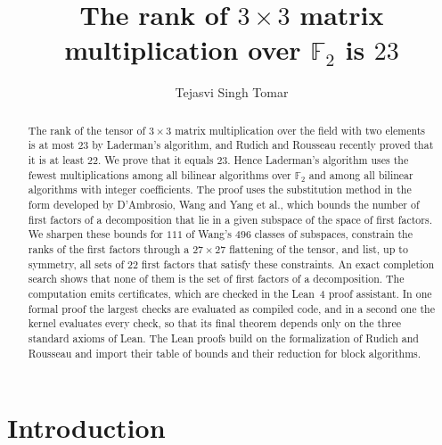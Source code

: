 \documentclass[11pt]{amsart}
\theoremstyle{definition}
\theoremstyle{remark}
\numberwithin{equation}{section}
\newcommand{\F}{\mathbb{F}_2}
\begin{document}
\title{The rank of $3\times 3$ matrix multiplication over $\F$ is $23$}
\author{Tejasvi Singh Tomar}
\address{Independent researcher}
\renewcommand{\urladdrname}{{\itshape ORCID}}

\begin{abstract}
The rank of the tensor of $3\times 3$ matrix multiplication over the field with two elements is at most $23$ by Laderman's algorithm, and Rudich and Rousseau recently proved that it is at least $22$. We prove that it equals $23$. Hence Laderman's algorithm uses the fewest multiplications among all bilinear algorithms over $\F$ and among all bilinear algorithms with integer coefficients. The proof uses the substitution method in the form developed by D'Ambrosio, Wang and Yang et al., which bounds the number of first factors of a decomposition that lie in a given subspace of the space of first factors. We sharpen these bounds for $111$ of Wang's $496$ classes of subspaces, constrain the ranks of the first factors through a $27\times 27$ flattening of the tensor, and list, up to symmetry, all sets of $22$ first factors that satisfy these constraints. An exact completion search shows that none of them is the set of first factors of a decomposition. The computation emits certificates, which are checked in the Lean~4 proof assistant. In one formal proof the largest checks are evaluated as compiled code, and in a second one the kernel evaluates every check, so that its final theorem depends only on the three standard axioms of Lean. The Lean proofs build on the formalization of Rudich and Rousseau and import their table of bounds and their reduction for block algorithms.
\end{abstract}

\maketitle

\section{Introduction}\label{sec:intro}
\end{document}
